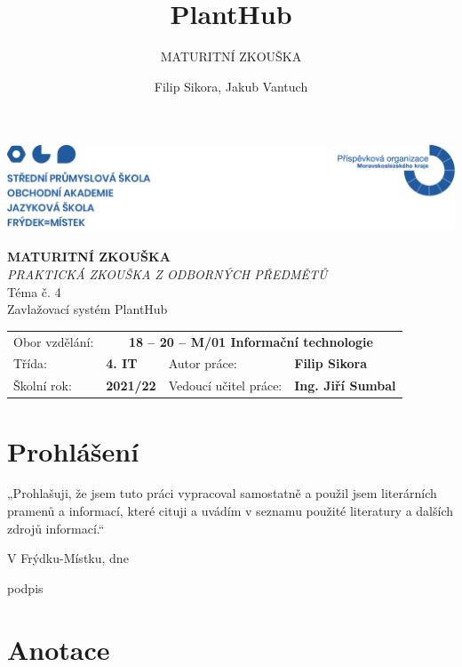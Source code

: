 \documentclass[12pt,a4paper]{article}
\title{PlantHub}
\subtitle{MATURITNÍ ZKOUŠKA }
\author{Filip Sikora, Jakub Vantuch}
\date{}
\newcommand*\wildcard[2][5cm]{\vspace*{2cm}\parbox{#1}{\centering\hrulefill\par#2\par}}
\begin{document}
\begin{titlepage}
	\noindent\includegraphics[width=\linewidth]{header.png}
	\vspace{1cm} \\
	\begin{center}
		\Huge\textbf{MATURITNÍ ZKOUŠKA}
		\vspace*{1.2cm} \\
		\large \emph{PRAKTICKÁ ZKOUŠKA Z ODBORNÝCH PŘEDMĚTŮ}
		\vspace*{5cm} \\
		\Large Téma č. 4 \\
		\vspace*{1cm}
		\Large Zavlažovací systém PlantHub \\
		\vfill
		\normalsize
	\end{center}
	\begin{tabularx}{\textwidth}{l@{\hskip 1.8cm}XXl}
		Obor vzdělání:        & \multicolumn{3}{c}{\textbf{18 – 20 –
				M/01
				Informační technologie}}
		\\[10pt]
		Třída:                & \textbf{4. IT}
		                      &
		Autor práce:          & \textbf{Filip Sikora}
		\\[10pt]
		Školní rok:           & \textbf{2021/22}
		                      &
		Vedoucí učitel práce: &
		\textbf{Ing. Jiří Sumbal}
	\end{tabularx}
\end{titlepage}

\section*{Prohlášení}

„Prohlašuji, že jsem tuto práci vypracoval samostatně a použil jsem literárních
pramenů a informací, které cituji a uvádím v seznamu použité literatury a
dalších zdrojů informací.“

\begingroup
\centering
\wildcard{V Frýdku-Místku, dne}
\hspace{1cm}
\wildcard{podpis}
\par
\endgroup

\clearpage

\clearpage

\section*{Anotace}
\end{document}
